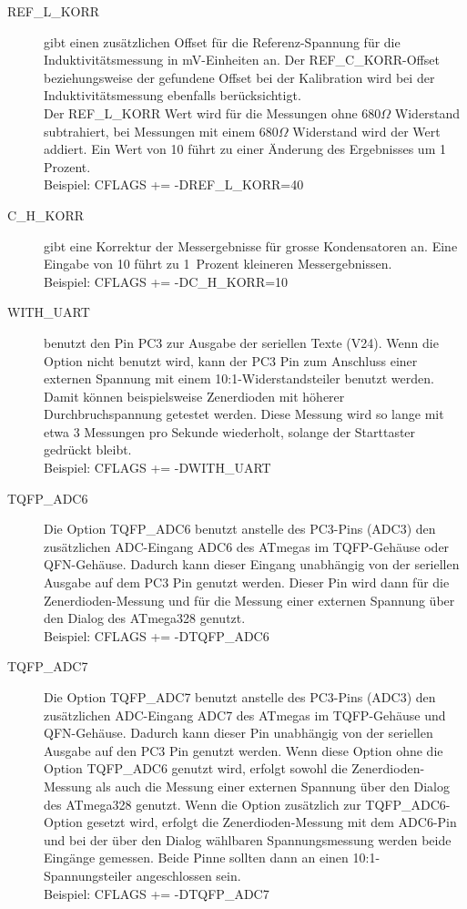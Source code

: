 \begin{description}
  \item[REF\_L\_KORR] gibt einen zusätzlichen Offset für die Referenz-Spannung für die Induktivitätsmessung
in mV-Einheiten an. Der REF\_C\_KORR-Offset beziehungsweise der gefundene Offset bei der Kalibration
wird bei der Induktivitätsmessung ebenfalls berücksichtigt.\\
Der REF\_L\_KORR Wert wird für die Messungen ohne \(680\Omega\) Widerstand subtrahiert, bei Messungen mit einem
\(680\Omega\) Widerstand wird der Wert addiert.
Ein Wert von 10 führt zu einer Änderung des Ergebnisses um 1 Prozent.\\
Beispiel: CFLAGS += -DREF\_L\_KORR=40

  \item[C\_H\_KORR] gibt eine Korrektur der Messergebnisse für grosse Kondensatoren an.
Eine Eingabe von 10 führt zu 1~Prozent kleineren Messergebnissen.\\
Beispiel: CFLAGS += -DC\_H\_KORR=10

  \item[WITH\_UART] benutzt den Pin PC3 zur Ausgabe der seriellen Texte (V24). Wenn die Option nicht
benutzt wird, kann der PC3 Pin zum Anschluss einer externen Spannung mit einem 10:1-Widerstandsteiler benutzt
werden. Damit können beispielsweise Zenerdioden mit höherer Durchbruchspannung getestet werden.
Diese Messung wird so lange mit etwa 3 Messungen pro Sekunde wiederholt, solange der Starttaster gedrückt bleibt.\\
Beispiel: CFLAGS += -DWITH\_UART

  \item[TQFP\_ADC6] Die Option TQFP\_ADC6 benutzt anstelle des PC3-Pins (ADC3) den zusätzlichen ADC-Eingang ADC6
des ATmegas im TQFP-Gehäuse oder QFN-Gehäuse.
Dadurch kann dieser Eingang unabhängig von der seriellen Ausgabe auf dem PC3 Pin genutzt werden. Dieser Pin wird
dann für die Zenerdioden-Messung und für die Messung einer externen Spannung über den Dialog des ATmega328 genutzt.\\
Beispiel: CFLAGS += -DTQFP\_ADC6

  \item[TQFP\_ADC7] Die Option TQFP\_ADC7 benutzt anstelle des PC3-Pins (ADC3) den zusätzlichen ADC-Eingang ADC7
des ATmegas im TQFP-Gehäuse und QFN-Gehäuse.
Dadurch kann dieser Pin unabhängig von der seriellen Ausgabe auf den PC3 Pin genutzt werden. Wenn diese Option 
ohne die Option TQFP\_ADC6 genutzt wird, erfolgt sowohl die Zenerdioden-Messung als auch die Messung einer externen
Spannung über den Dialog des ATmega328 genutzt. Wenn die Option zusätzlich zur TQFP\_ADC6-Option gesetzt wird,
erfolgt die Zenerdioden-Messung mit dem ADC6-Pin und bei der über den Dialog wählbaren Spannungsmessung werden
beide Eingänge gemessen. Beide Pinne sollten dann an einen 10:1-Spannungsteiler angeschlossen sein.\\
Beispiel: CFLAGS += -DTQFP\_ADC7


\end{description}
